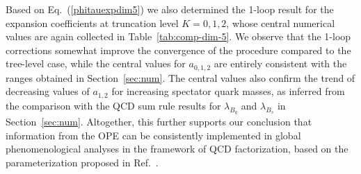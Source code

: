 \documentclass[a4paper,11pt]{article}
\begin{document}
%
Based on Eq.~(\ref{phitauexpdim5}) we also determined the 1-loop result for the expansion coefficients at truncation level $K=0,1,2$, whose central numerical values are again collected in Table~\ref{tab:comp-dim-5}. We observe that the 1-loop corrections somewhat improve the convergence of the procedure compared to the tree-level case, while the 
central values for $a_{0,1,2}$ are entirely consistent with the ranges obtained in Section~\ref{sec:num}.
The central values also confirm the trend of decreasing values of $a_{1,2}$ for increasing spectator quark masses, 
as inferred from the comparison with the QCD sum rule results for $\lambda_{B_q}$ and $\lambda_{B_s}$
in Section~\ref{sec:num}.
%
Altogether, this further supports our conclusion that information from the OPE can be consistently implemented in global phenomenological analyses 
in the framework of QCD factorization, based on the parameterization proposed in Ref.~\cite{Feldmann:2022uok}.




\end{document}
